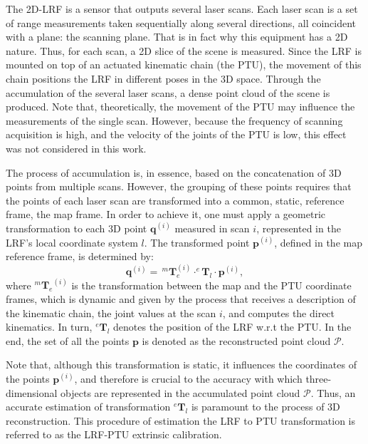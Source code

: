 \documentclass[conference]{IEEEtran}
\begin{document}
The 2D-LRF is a sensor that outputs several laser scans. Each laser scan is a set of range measurements taken sequentially along several directions, all coincident with a plane: the scanning plane. That is in fact why this equipment has a 2D nature. Thus, for each scan, a 2D slice of the scene is measured. Since the LRF is mounted on top of an actuated kinematic chain (the PTU), the movement of this chain positions the LRF in different poses in the 3D space. Through the accumulation of the several laser scans, a dense point cloud of the scene is produced. Note that, theoretically, the movement of the PTU may influence the measurements of the single scan. However, because the frequency of scanning acquisition is high, and the velocity of the joints of the PTU is low, this effect was not considered in this work.

The process of accumulation is, in essence, based on the concatenation of 3D points from multiple scans. However, the grouping of these points requires that the points of each laser scan are transformed into a common, static, reference frame, the map frame. In order to achieve it, one must apply a geometric transformation to each 3D point $\mathbf{q}^{(i)}$ measured in scan $i$, represented in the LRF's local coordinate system $l$. The transformed point $\mathbf{p}^{(i)}$, defined in the map reference frame, is determined by:
%
\begin{equation}\label{equation:point-reconstruction}
    \mathbf{q}^{(i)} = \, ^{m}\mathbf{T}_{e}^{(i)} \cdot ^{e}\mathbf{T}_{l} \cdot \mathbf{p}^{(i)},
\end{equation}
%
\noindent where ${^{m}\mathbf{T}_{e}}^{(i)}$ is the transformation between the map and the PTU coordinate frames, which is dynamic and given by the process that receives a description of the kinematic chain, the joint values at the scan $i$, and computes the direct kinematics. In turn, $^{e}\mathbf{T}_{l}$ denotes the position of the LRF w.r.t the PTU. In the end, the set of all the points $\mathbf{p}$ is denoted as the reconstructed point cloud $\mathcal{P}$.

Note that, although this transformation is static, it influences the coordinates of the points $\mathbf{p}^{(i)}$, and therefore is crucial to the accuracy with which three-dimensional objects are represented in the accumulated point cloud $\mathcal{P}$.
Thus, an accurate estimation of transformation $^{e}\mathbf{T}_{l}$ is paramount to the process of 3D reconstruction. This procedure of estimation the LRF to PTU transformation is referred to as the LRF-PTU extrinsic calibration.
\end{document}

